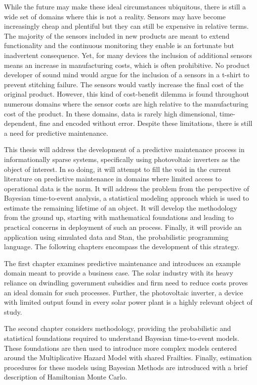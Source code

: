 While the future may make these ideal circumstances ubiquitous, there is still a wide set of domains where this is not a reality. Sensors may have become increasingly cheap and plentiful but they can still be expensive in relative terms. The majority of the sensors included in new products are meant to extend functionality and the continuous monitoring they enable is an fortunate but inadvertent consequence. Yet, for many devices the inclusion of additional sensors means an increase in manufacturing costs, which is often prohibitive. No product developer of sound mind would argue for the inclusion of a sensors in a t-shirt to prevent stitching failure. The sensors would vastly increase the final cost of the original product. However, this kind of cost-benefit dilemma is found throughout numerous domains where the sensor costs are high relative to the manufacturing cost of the product. In these domains, data is rarely high dimensional, time-dependent, fine and encoded without error. Despite these limitations, there is still a need for predictive maintenance. 

This thesis will address the development of a predictive maintenance process in informationally sparse systems, specifically using photovoltaic inverters as the object of interest. In so doing, it will attempt to fill the void in the current literature on predictive maintenance in domains where limited access to operational data is the norm. It will address the problem from the perspective of Bayesian time-to-event analysis, a statistical modeling approach which is used to estimate the remaining lifetime of an object. It will develop the methodology from the ground up, starting with mathematical foundations and leading to practical concerns in deployment of such an process. Finally, it will provide an application using simulated data and Stan, the probabilistic programming language. The following chapters encompass the development of this strategy. 

The first chapter examines predictive maintenance and introduces an example domain meant to provide a business case. The solar industry with its heavy reliance on dwindling government subsidies and firm need to reduce costs proves an ideal domain for such processes. Further, the photovoltaic inverter, a device with limited output found in every solar power plant is a highly relevant object of study. 

The second chapter considers methodology, providing the probabilistic and statistical foundations required to understand Bayesian time-to-event models. These foundations are then used to introduce more complex models centered around the Multiplicative Hazard Model with shared Frailties. Finally, estimation procedures for these models using Bayesian Methods are introduced with a brief description of Hamiltonian Monte Carlo. 

